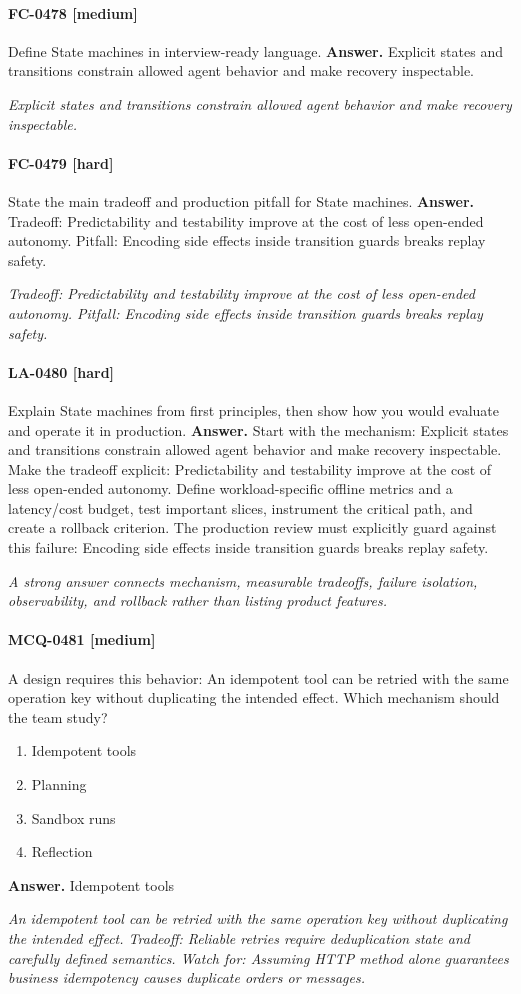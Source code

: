 \paragraph{FC-0478 [medium]} Define State machines in interview-ready language.
\noindent\textbf{Answer.} Explicit states and transitions constrain allowed agent behavior and make recovery inspectable.
\par\textit{Explicit states and transitions constrain allowed agent behavior and make recovery inspectable.}
\paragraph{FC-0479 [hard]} State the main tradeoff and production pitfall for State machines.
\noindent\textbf{Answer.} Tradeoff: Predictability and testability improve at the cost of less open-ended autonomy. Pitfall: Encoding side effects inside transition guards breaks replay safety.
\par\textit{Tradeoff: Predictability and testability improve at the cost of less open-ended autonomy. Pitfall: Encoding side effects inside transition guards breaks replay safety.}
\paragraph{LA-0480 [hard]} Explain State machines from first principles, then show how you would evaluate and operate it in production.
\noindent\textbf{Answer.} Start with the mechanism: Explicit states and transitions constrain allowed agent behavior and make recovery inspectable. Make the tradeoff explicit: Predictability and testability improve at the cost of less open-ended autonomy. Define workload-specific offline metrics and a latency/cost budget, test important slices, instrument the critical path, and create a rollback criterion. The production review must explicitly guard against this failure: Encoding side effects inside transition guards breaks replay safety.
\par\textit{A strong answer connects mechanism, measurable tradeoffs, failure isolation, observability, and rollback rather than listing product features.}
\paragraph{MCQ-0481 [medium]} A design requires this behavior: An idempotent tool can be retried with the same operation key without duplicating the intended effect. Which mechanism should the team study?
\begin{enumerate}[label=\Alph*.]
\item Idempotent tools
\item Planning
\item Sandbox runs
\item Reflection
\end{enumerate}
\noindent\textbf{Answer.} Idempotent tools
\par\textit{An idempotent tool can be retried with the same operation key without duplicating the intended effect. Tradeoff: Reliable retries require deduplication state and carefully defined semantics. Watch for: Assuming HTTP method alone guarantees business idempotency causes duplicate orders or messages.}
